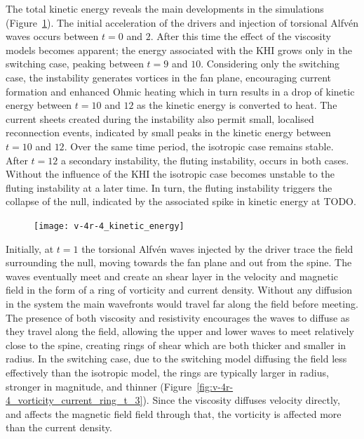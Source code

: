 The total kinetic energy reveals the main developments in the simulations (Figure~\ref{fig:v-4r-4_kinetic_energy}). The initial acceleration of the drivers and injection of torsional Alfv\'en waves occurs between $t=0$ and $2$. After this time the effect of the viscosity models becomes apparent; the energy associated with the KHI grows only in the switching case, peaking between $t=9$ and $10$. Considering only the switching case, the instability generates vortices in the fan plane, encouraging current formation and enhanced Ohmic heating which in turn results in a drop of kinetic energy between $t=10$ and $12$ as the kinetic energy is converted to heat. The current sheets created during the instability also permit small, localised reconnection events, indicated by small peaks in the kinetic energy between $t=10$ and $12$. Over the same time period, the isotropic case remains stable. After $t=12$ a secondary instability, the fluting instability, occurs in both cases. Without the influence of the KHI the isotropic case becomes unstable to the fluting instability at a later time. In turn, the fluting instability triggers the collapse of the null, indicated by the associated spike in kinetic energy at TODO.

\begin{figure}[t]
  \centering
  \texttt{[image: v-4r-4\_kinetic\_energy]}
  \caption{}%
  \label{fig:v-4r-4_kinetic_energy}
\end{figure}

Initially, at $t=1$ the torsional Alfv\'en waves injected by the driver trace the field surrounding the null, moving towards the fan plane and out from the spine. The waves eventually meet and create an shear layer in the velocity and magnetic field in the form of a ring of vorticity and current density. Without any diffusion in the system the main wavefronts would travel far along the field before meeting. The presence of both viscosity and resistivity encourages the waves to diffuse as they travel along the field, allowing the upper and lower waves to meet relatively close to the spine, creating rings of shear which are both thicker and smaller in radius. In the switching case, due to the switching model diffusing the field less effectively than the isotropic model, the rings are typically larger in radius, stronger in magnitude, and thinner (Figure~\ref{fig:v-4r-4_vorticity_current_ring_t_3}). Since the viscosity diffuses velocity directly, and affects the magnetic field field through that, the vorticity is affected more than the current density.

